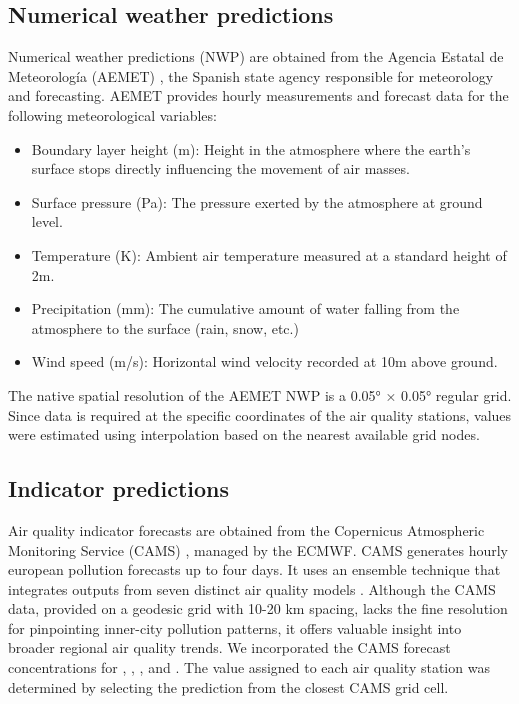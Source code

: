 \documentclass[12pt,a4paper]{book}
\begin{document}
\subsection{Numerical weather predictions}
Numerical weather predictions (NWP) are obtained from the Agencia Estatal de Meteorología (AEMET) \citep{meteorologia_agencia_nodate}, the Spanish state agency responsible for meteorology and forecasting. AEMET provides hourly measurements and forecast data for the following meteorological variables:
\begin{itemize}
    \item Boundary layer height (m): Height in the atmosphere where the earth's surface stops directly influencing the movement of air masses.
    \item Surface pressure (Pa): The pressure exerted by the atmosphere at ground level.
    \item Temperature (K): Ambient air temperature measured at a standard height of 2m.
    \item Precipitation (mm): The cumulative amount of water falling from the atmosphere to the surface (rain, snow, etc.)
    \item Wind speed (m/s): Horizontal wind velocity recorded at 10m above ground.
\end{itemize}
The native spatial resolution of the AEMET NWP is a 0.05° × 0.05° regular grid. Since data is required at the specific coordinates of the air quality stations, values were estimated using interpolation based on the nearest available grid nodes.

\subsection{Indicator predictions}
Air quality indicator forecasts are obtained from the Copernicus Atmospheric Monitoring Service (CAMS) \citep{cams}, managed by the ECMWF. CAMS generates hourly european pollution forecasts up to four days. It uses an ensemble technique that integrates outputs from seven distinct air quality models \citep{marecal_regional_2015}. Although the CAMS data, provided on a geodesic grid with 10-20 km spacing, lacks the fine resolution for pinpointing inner-city pollution patterns, it offers valuable insight into broader regional air quality trends. We incorporated the CAMS forecast concentrations for \ot, \no, \pmtwo{}, and \pmten{}. The value assigned to each air quality station was determined by selecting the prediction from the closest CAMS grid cell.
\end{document}
